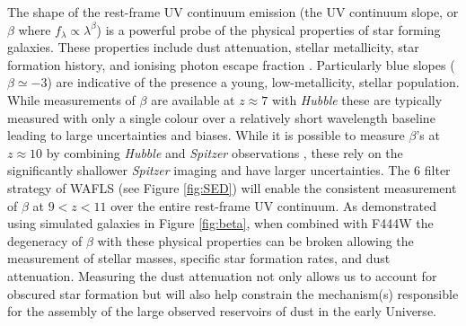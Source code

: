 \documentclass[12pt]{article}
\begin{document}
The shape of the rest-frame UV continuum emission (the UV continuum slope, or $\beta$ where $f_{\lambda}\propto\lambda^{\beta}$) is a powerful probe of the physical properties of star forming galaxies. These properties include dust attenuation, stellar metallicity, star formation history, and ionising photon escape fraction \cite{2013MNRAS.430.2885W}. Particularly blue slopes ($\beta\simeq -3$) are indicative of the presence a young, low-metallicity, stellar population. While measurements of $\beta$ are available at $z\approx 7$ with {\em Hubble} these are typically measured with only a single colour over a relatively short wavelength baseline leading to large uncertainties and biases. While it is possible to measure $\beta$'s at $z\approx 10$ by combining {\em Hubble} and {\em Spitzer} observations \cite{2016MNRAS.455..659W}, these rely on the significantly shallower {\em Spitzer} imaging and have larger uncertainties. The 6 filter strategy of WAFLS (see Figure \ref{fig:SED}) will enable the consistent measurement of $\beta$ at $9<z<11$ over the entire rest-frame UV continuum. As demonstrated using simulated galaxies in Figure \ref{fig:beta}, when combined with F444W the degeneracy of $\beta$ with these physical properties can be broken allowing the measurement of stellar masses, specific star formation rates, and dust attenuation. Measuring the dust attenuation not only allows us to account for obscured star formation but will also help constrain the mechanism(s) responsible for the assembly of the large observed reservoirs of dust in the early Universe.
\end{document}
